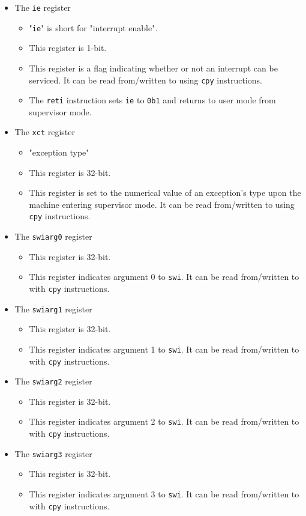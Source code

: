 \documentclass{article}
\begin{document}
\begin{itemize}
\begin{itemize}
		\end{itemize}
	\item The \texttt{ie} register
		\begin{itemize}
		\item "\texttt{ie}" is short for "interrupt enable".
		\item This register is 1-bit.
		\item This register is a flag indicating whether or not an
			interrupt can be serviced. It can be read from/written to using
			\texttt{cpy} instructions.
		\item The \texttt{reti} instruction sets \texttt{ie} to
			\texttt{0b1} and returns to user mode from supervisor mode.
		\end{itemize}
	\item The \texttt{xct} register
		\begin{itemize}
		\item "exception type"
		\item This register is 32-bit.
		\item This register is set to the numerical value of an exception's
			type upon the machine entering supervisor mode. It can be read
			from/written to using \texttt{cpy} instructions.
		\end{itemize}
	\item The \texttt{swiarg0} register
		\begin{itemize}
		\item This register is 32-bit.
		\item This register indicates argument 0 to \texttt{swi}. It can
			be read from/written to with \texttt{cpy} instructions.
		\end{itemize}
	\item The \texttt{swiarg1} register
		\begin{itemize}
		\item This register is 32-bit.
		\item This register indicates argument 1 to \texttt{swi}. It can
			be read from/written to with \texttt{cpy} instructions.
		\end{itemize}
	\item The \texttt{swiarg2} register
		\begin{itemize}
		\item This register is 32-bit.
		\item This register indicates argument 2 to \texttt{swi}. It can
			be read from/written to with \texttt{cpy} instructions.
		\end{itemize}
	\item The \texttt{swiarg3} register
		\begin{itemize}
		\item This register is 32-bit.
		\item This register indicates argument 3 to \texttt{swi}. It can
			be read from/written to with \texttt{cpy} instructions.
		\end{itemize}
	\end{itemize}
	\newpage
\end{document}
